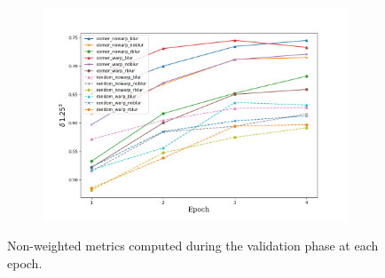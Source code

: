 \begin{figure}
\begin{adjustwidth}{-0.2\textwidth}{-0.2\textwidth}
        \begin{subfigure}{0.6\textwidth}
            \includegraphics[width=\textwidth]{figs/a3}
        \end{subfigure}
    \end{adjustwidth}
    \caption{
        Non-weighted metrics computed during the validation phase at each epoch.
        \label{fig:validation}
    }
\end{figure}

